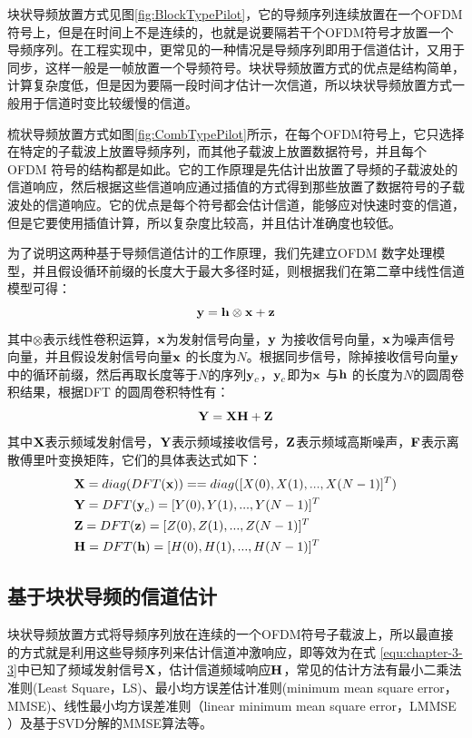 块状导频放置方式见图\ref{fig:BlockTypePilot}，它的导频序列连续放置在一个OFDM符号上，但是在时间上不是连续的，也就是说要隔若干个OFDM符号才放置一个导频序列。在工程实现中，更常见的一种情况是导频序列即用于信道估计，又用于同步，这样一般是一帧放置一个导频符号。块状导频放置方式的优点是结构简单，计算复杂度低，但是因为要隔一段时间才估计一次信道，所以块状导频放置方式一般用于信道时变比较缓慢的信道。

梳状导频放置方式如图\ref{fig:CombTypePilot}所示，在每个OFDM符号上，它只选择在特定的子载波上放置导频序列，而其他子载波上放置数据符号，并且每个OFDM 符号的结构都是如此。它的工作原理是先估计出放置了导频的子载波处的信道响应，然后根据这些信道响应通过插值的方式得到那些放置了数据符号的子载波处的信道响应。它的优点是每个符号都会估计信道，能够应对快速时变的信道，但是它要使用插值计算，所以复杂度比较高，并且估计准确度也较低。

为了说明这两种基于导频信道估计的工作原理，我们先建立OFDM 数字处理模型，并且假设循环前缀的长度大于最大多径时延，则根据我们在第二章中线性信道模型可得：
\begin{equation}
\bf y=h\otimes x+z
\label{equ:time-domain signal}
\end{equation}
其中$\otimes$表示线性卷积运算，$\textbf x$为发射信号向量，$\textbf y$ 为接收信号向量，$\textbf x$为噪声信号向量，并且假设发射信号向量$\textbf x$ 的长度为$N$。根据同步信号，除掉接收信号向量$\textbf y$中的循环前缀，然后再取长度等于$N$的序列$\textbf y_c$，$\textbf y_c$即为$\textbf x$ 与$\textbf h$ 的长度为$N$的圆周卷积结果，根据DFT 的圆周卷积特性有：
\begin{equation}
\bf Y=XH+Z
\label{equ:chapter-3-3}
\end{equation}
其中$\textbf X$表示频域发射信号，$\textbf Y$表示频域接收信号，$\textbf Z$表示频域高斯噪声，$\textbf F$表示离散傅里叶变换矩阵，它们的具体表达式如下：
\begin{equation}
\begin{aligned}
&\textbf X=diag(DFT(\textbf x))==diag([ X(0), X(1),..., X(N-1)]^T)\\
&\textbf Y=DFT(\textbf y_c) =[ Y(0), Y(1),..., Y(N-1)]^{T} \\
&\textbf Z=DFT(\textbf z) =[ Z(0), Z(1),..., Z(N-1)]^{T} \\
&\textbf H=DFT(\textbf h) =[ H(0), H(1),..., H(N-1)]^{T} \\
\end{aligned}
\end{equation}
\subsection{基于块状导频的信道估计}
块状导频放置方式将导频序列放在连续的一个OFDM符号子载波上，所以最直接的方式就是利用这些导频序列来估计信道冲激响应，即等效为在式
\ref{equ:chapter-3-3}中已知了频域发射信号$\textbf X$，估计信道频域响应$\textbf H$，常见的估计方法有最小二乘法准则(Least Square，LS)、最小均方误差估计准则(minimum mean square error，MMSE)、线性最小均方误差准则（linear minimum mean square error，LMMSE ）及基于SVD分解的MMSE算法等。
